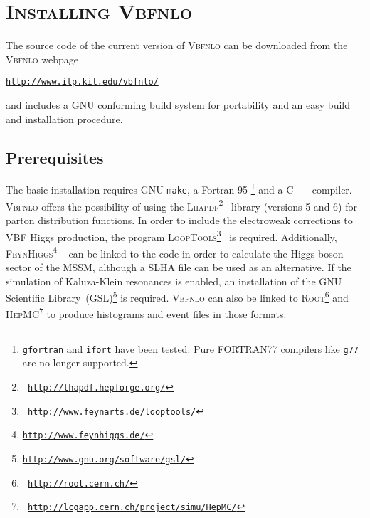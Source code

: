 \documentclass[english,12pt]{article}
\begin{document}

\newpage

\section{\textsc{Installing Vbfnlo}}

The source code of the current version of \textsc{Vbfnlo} can be
downloaded from the \textsc{Vbfnlo} webpage
%
\begin{center}
\href{http://www.itp.kit.edu/vbfnlo/}{\tt http://www.itp.kit.edu/vbfnlo/}
\end{center}
%
and includes a GNU conforming build system for portability and an
easy build and installation procedure.

\subsection{Prerequisites}

The basic installation requires GNU {\tt make}, a {\sc Fortran} 95 \footnote{{\tt gfortran}
and {\tt ifort} have been tested. Pure FORTRAN77 compilers like {\tt g77} are no longer supported.} and a C++ compiler.
\textsc{Vbfnlo} offers the possibility of using the \textsc{Lhapdf}\footnote{\tt
\href{http://lhapdf.hepforge.org/}{http://lhapdf.hepforge.org/}}~\cite{Whalley:2005nh} library (versions 5 and 6) for parton
distribution functions. In order to include the electroweak corrections to VBF
Higgs production, the program \textsc{LoopTools}\footnote{\tt
\href{http://www.feynarts.de/looptools/}{http://www.feynarts.de/looptools/}}~\cite{Hahn:1998yk,Hahn:2006qw} is required.
Additionally, \textsc{FeynHiggs}\footnote{\tt \href{http://www.feynhiggs.de/}{http://www.feynhiggs.de/}}
~\cite{Frank:2006yh,Degrassi:2002fi,Heinemeyer:1998np,Heinemeyer:1998yj} can be
linked to the code in order to calculate the Higgs boson sector of the MSSM,
although a SLHA file can be used as an alternative.  If the simulation of
Kaluza-Klein resonances is enabled, an installation of the GNU Scientific
Library~(GSL)\footnote{\tt \href{http://www.gnu.org/software/gsl/}{http://www.gnu.org/software/gsl/}} is required.
\textsc{Vbfnlo} can also be linked to \textsc{Root}\footnote{\tt
\href{http://root.cern.ch/}{http://root.cern.ch/}} and \textsc{HepMC}\footnote{\tt
\href{http://lcgapp.cern.ch/project/simu/HepMC/}{http://lcgapp.cern.ch/project/simu/HepMC/}} to produce histograms and event files
in those formats. 
\end{document}
